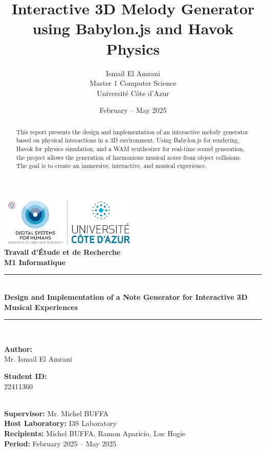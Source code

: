 \documentclass[a4paper,11pt]{article}
\title{\textbf{Interactive 3D Melody Generator using Babylon.js and Havok Physics}}
\author{Ismail El Amrani \\ Master 1 Computer Science \\ Universit\'e C\^ote d'Azur}
\date{February -- May 2025}
\begin{document}
\begin{titlepage}
    \centering
    \vspace*{2cm}
    \includegraphics[width=0.5\textwidth]{logo-Unica.png}\\[2cm]
    \textbf{\Large Travail d'\'Etude et de Recherche}\\[0.5cm]
    \textbf{\Large M1 Informatique}\\[1.5cm]
    \rule{\linewidth}{0.5mm} \\[0.4cm]
    {\huge \bfseries Design and Implementation of a Note Generator for Interactive 3D Musical Experiences\\[0.4cm]}
    \rule{\linewidth}{0.5mm} \\[1.5cm]
    \begin{minipage}[t]{0.4\textwidth}
        \begin{flushleft} \large
        \textbf{Author:} \\
        Mr. Ismail El Amrani
        \end{flushleft}
    \end{minipage}%
    \hfill
    \begin{minipage}[t]{0.4\textwidth}
        \begin{flushright} \large
        \textbf{Student ID:} \\
        22411360
        \end{flushright}
    \end{minipage} \\[1.5cm]
    \textbf{Supervisor:} Mr. Michel BUFFA \\[0.5cm]
    \textbf{Host Laboratory:} I3S Laboratory \\[0.5cm]
    \textbf{Recipients:} Michel BUFFA, Ramon Aparicio, Luc Hogie \\[0.5cm]
    \textbf{Period:} February 2025 -- May 2025
    \vfill
\end{titlepage}

\begin{abstract}
This report presents the design and implementation of an interactive melody generator based on physical interactions in a 3D environment. Using Babylon.js for rendering, Havok for physics simulation, and a WAM synthesizer for real-time sound generation, the project allows the generation of harmonious musical notes from object collisions. The goal is to create an immersive, interactive, and musical experience.
\end{abstract}
\end{document}
